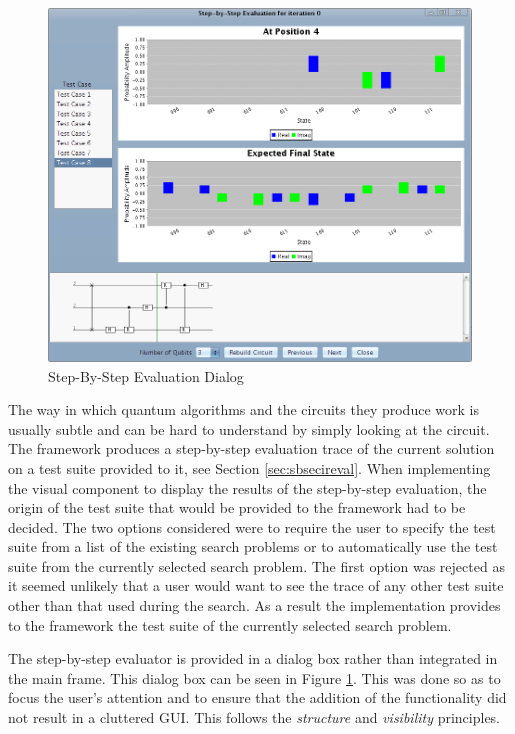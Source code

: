 \begin{figure}
 \includegraphics[width=\textwidth]{StepByStepEval.png}
\caption{Step-By-Step Evaluation Dialog}
\label{fig:StepByStepEval}
\end{figure}
The way in which quantum algorithms and the circuits they produce work is usually subtle and can be hard to understand by simply looking at the circuit.
The framework produces a step-by-step evaluation trace of the current solution on a test suite provided to it, see Section \ref{sec:sbsecireval}.
When implementing the visual component to display the results of the step-by-step evaluation, the origin of the test suite that would be provided to the framework had to be decided.
The two options considered were to require the user to specify the test suite from a list of the existing search problems or to automatically use the test suite from the currently selected search problem.
The first option was rejected as it seemed unlikely that a user would want to see the trace of any other test suite other than that used during the search.
As a result the implementation provides to the framework the test suite of the currently selected search problem.

The step-by-step evaluator is provided in a dialog box rather than integrated in the main frame.
This dialog box can be seen in Figure \ref{fig:StepByStepEval}.
This was done so as to focus the user's attention and to ensure that the addition of the functionality did not result in a cluttered GUI.
This follows the \emph{structure} and \emph{visibility} principles.

